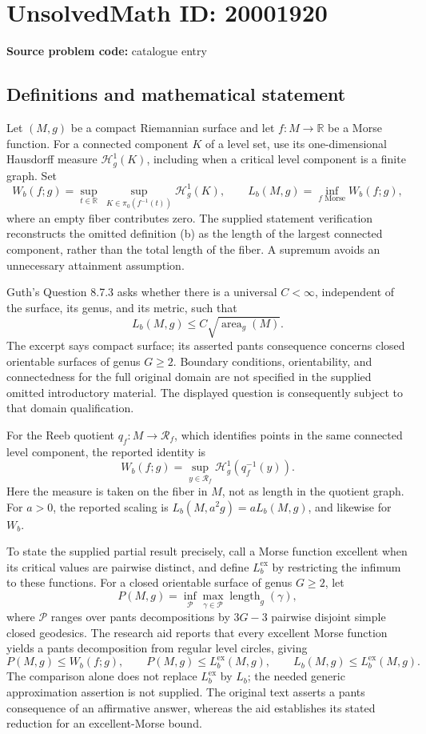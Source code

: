 \documentclass[11pt]{article}
\newcommand{\R}{\mathbb{R}}
\begin{document}
\section*{UnsolvedMath ID: 20001920}
\textbf{Source problem code:} catalogue entry
\subsection{Definitions and mathematical statement}
Let \((M,g)\) be a compact Riemannian surface and let \(f:M\to\R\) be a Morse function. For a connected component \(K\) of a level set, use its one-dimensional Hausdorff measure \(\mathcal H_g^1(K)\), including when a critical level component is a finite graph. Set
\[
 W_b(f;g)=\sup_{t\in\R}\ \sup_{K\in\pi_0(f^{-1}(t))}\mathcal H_g^1(K),\qquad
 L_b(M,g)=\inf_{f\text{ Morse}}W_b(f;g),
\]
where an empty fiber contributes zero. The supplied statement verification reconstructs the omitted definition (b) as the length of the largest connected component, rather than the total length of the fiber. A supremum avoids an unnecessary attainment assumption.

Guth's Question 8.7.3 asks whether there is a universal \(C<\infty\), independent of the surface, its genus, and its metric, such that
\[
 L_b(M,g)\le C\sqrt{\operatorname{area}_g(M)}.
\]
The excerpt says compact surface; its asserted pants consequence concerns closed orientable surfaces of genus \(G\ge2\). Boundary conditions, orientability, and connectedness for the full original domain are not specified in the supplied omitted introductory material. The displayed question is consequently subject to that domain qualification.

For the Reeb quotient \(q_f:M\to\mathcal R_f\), which identifies points in the same connected level component, the reported identity is
\[
 W_b(f;g)=\sup_{y\in\mathcal R_f}\mathcal H_g^1(q_f^{-1}(y)).
\]
Here the measure is taken on the fiber in \(M\), not as length in the quotient graph. For \(a>0\), the reported scaling is \(L_b(M,a^2g)=aL_b(M,g)\), and likewise for \(W_b\).

To state the supplied partial result precisely, call a Morse function excellent when its critical values are pairwise distinct, and define \(L_b^{\mathrm{ex}}\) by restricting the infimum to these functions. For a closed orientable surface of genus \(G\ge2\), let
\[
 P(M,g)=\inf_{\mathcal P}\max_{\gamma\in\mathcal P}\operatorname{length}_g(\gamma),
\]
where \(\mathcal P\) ranges over pants decompositions by \(3G-3\) pairwise disjoint simple closed geodesics. The research aid reports that every excellent Morse function yields a pants decomposition from regular level circles, giving
\[
 P(M,g)\le W_b(f;g),\qquad P(M,g)\le L_b^{\mathrm{ex}}(M,g),\qquad L_b(M,g)\le L_b^{\mathrm{ex}}(M,g).
\]
The comparison alone does not replace \(L_b^{\mathrm{ex}}\) by \(L_b\); the needed generic approximation assertion is not supplied. The original text asserts a pants consequence of an affirmative answer, whereas the aid establishes its stated reduction for an excellent-Morse bound.
\end{document}
